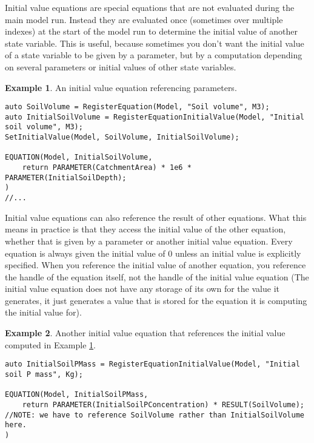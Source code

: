 \documentclass[11pt]{article}
\theoremstyle{definition}
\newtheorem{myexample}{Example}
\newenvironment{example}%
  {\begin{lrbox}{\examplebox}%
   \begin{minipage}{\dimexpr\linewidth-2\fboxsep}
   \begin{myexample}}%
  {\end{myexample}%
   \end{minipage}%
   \end{lrbox}%
   \begin{trivlist}
     \item[]\colorbox{silver}{\usebox\examplebox}
   \end{trivlist}}
\begin{document}
Initial value equations are special equations that are not evaluated during the main model run. Instead they are evaluated once (sometimes over multiple indexes) at the start of the model run to determine the initial value of another state variable. This is useful, because sometimes you don't want the initial value of a state variable to be given by a parameter, but by a computation depending on several parameters or initial values of other state variables.

\begin{example}\label{ex:initialvalue}
An initial value equation referencing parameters.
\begin{lstlisting}[style=mycpp]
auto SoilVolume = RegisterEquation(Model, "Soil volume", M3);
auto InitialSoilVolume = RegisterEquationInitialValue(Model, "Initial soil volume", M3);
SetInitialValue(Model, SoilVolume, InitialSoilVolume);

EQUATION(Model, InitialSoilVolume,
	return PARAMETER(CatchmentArea) * 1e6 * PARAMETER(InitialSoilDepth);
)
//...
\end{lstlisting}
\end{example}

Initial value equations can also reference the result of other equations. What this means in practice is that they access the initial value of the other equation, whether that is given by a parameter or another initial value equation. Every equation is always given the initial value of 0 unless an initial value is explicitly specified. When you reference the initial value of another equation, you reference the handle of the equation itself, not the handle of the initial value equation (The initial value equation does not have any storage of its own for the value it generates, it just generates a value that is stored for the equation it is computing the initial value for).

\begin{example}
Another initial value equation that references the initial value computed in Example \ref{ex:initialvalue}.
\begin{lstlisting}[style=mycpp]
auto InitialSoilPMass = RegisterEquationInitialValue(Model, "Initial soil P mass", Kg);

EQUATION(Model, InitialSoilPMass,
	return PARAMETER(InitialSoilPConcentration) * RESULT(SoilVolume); //NOTE: we have to reference SoilVolume rather than InitialSoilVolume here.
)
\end{lstlisting}
\end{example}
\end{document}
